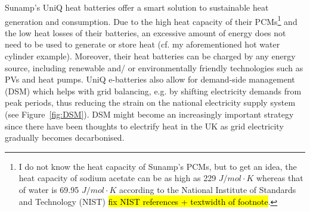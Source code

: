 Sunamp’s UniQ heat batteries offer a smart solution to sustainable heat generation and consumption.
Due to the high heat capacity of their PCMs\footnote{
	I do not know the heat capacity of Sunamp's PCMs, but to get an idea, the heat capacity of sodium acetate can be as high as 229 $J/mol \cdot K$ 
	whereas that of water is 69.95 $J/mol \cdot K$ 
	according to the National Institute of Standards and Technology (NIST) \hl{fix NIST references + textwidth of footnote}.
} and the low heat losses of their batteries, an excessive amount of energy does not need to be used to generate or store heat (cf. my aforementioned hot water cylinder example).
Moreover, their heat batteries can be charged by any energy source, including renewable and/ or environmentally friendly technologies such as PVs and heat pumps. %
UniQ e-batteries also allow for demand-side management (DSM) which helps with grid balancing, e.g. by shifting electricity demands from peak periods, thus reducing the strain on the national electricity supply system (see Figure~\ref{fig:DSM}).
DSM might become an increasingly important strategy since there have been thoughts to electrify heat in the UK as grid electricity gradually becomes decarbonised.


